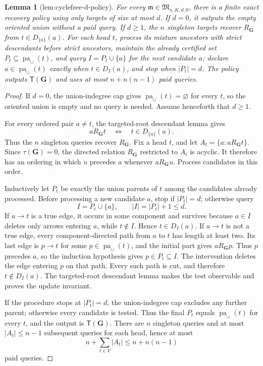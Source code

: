 \documentclass{article}
\newtheorem{lemma}{Lemma}
\begin{document}
\begin{lemma}[lem:cyclefree-d-policy]\label{lem:cyclefree-d-policy}
For every \(\mathfrak m\in\mathfrak M_{n,K,d,0}\), there is a finite exact recovery policy using only targets of size at most \(d\). If \(d=0\), it outputs the empty oriented union without a paid query. If \(d\ge1\), the \(n\) singleton targets recover \(R_{\mathbf G}\) from \(t\in D_{\{a\}}(a)\). For each head \(t\), process its mixture ancestors with strict descendants before strict ancestors, maintain the already certified set \(P_t\subseteq\operatorname{pa}_{\cup}(t)\), and query \(I=P_t\cup\{a\}\) for the next candidate \(a\); declare \(a\in\operatorname{pa}_{\cup}(t)\) exactly when \(t\in D_I(a)\), and stop when \(|P_t|=d\). The policy outputs \(\mathsf T(\mathbf G)\) and uses at most \(n+n(n-1)\) paid queries.
\end{lemma}
\begin{proof}
If \(d=0\), the union-indegree cap gives \(\operatorname{pa}_{\cup}(t)=\varnothing\) for every \(t\), so the oriented union is empty and no query is needed. Assume henceforth that \(d\ge1\).

For every ordered pair \(a\ne t\), the targeted-root descendant lemma gives
\[
 aR_{\mathbf G}t
 \quad\Longleftrightarrow\quad
 t\in D_{\{a\}}(a).
\]
Thus the \(n\) singleton queries recover \(R_{\mathbf G}\). Fix a head \(t\), and let \(A_t=\{a:aR_{\mathbf G}t\}\). Since \(\tau(\mathbf G)=0\), the directed relation \(R_{\mathbf G}\) restricted to \(A_t\) is acyclic. It therefore has an ordering in which \(u\) precedes \(a\) whenever \(aR_{\mathbf G}u\). Process candidates in this order.

Inductively let \(P_t\) be exactly the union parents of \(t\) among the candidates already processed. Before processing a new candidate \(a\), stop if \(|P_t|=d\); otherwise query
\[
 I=P_t\cup\{a\},\qquad |I|=|P_t|+1\le d.
\]
If \(a\to t\) is a true edge, it occurs in some component and survives because \(a\in I\) deletes only arrows entering \(a\), while \(t\notin I\). Hence \(t\in D_I(a)\). If \(a\to t\) is not a true edge, every component-directed path from \(a\) to \(t\) has length at least two. Its last edge is \(p\to t\) for some \(p\in\operatorname{pa}_{\cup}(t)\), and the initial part gives \(aR_{\mathbf G}p\). Thus \(p\) precedes \(a\), so the induction hypothesis gives \(p\in P_t\subseteq I\). The intervention deletes the edge entering \(p\) on that path. Every such path is cut, and therefore \(t\notin D_I(a)\). The targeted-root descendant lemma makes the test observable and proves the update invariant.

If the procedure stops at \(|P_t|=d\), the union-indegree cap excludes any further parent; otherwise every candidate is tested. Thus the final \(P_t\) equals \(\operatorname{pa}_{\cup}(t)\) for every \(t\), and the output is \(\mathsf T(\mathbf G)\). There are \(n\) singleton queries and at most \(|A_t|\le n-1\) subsequent queries for each head, hence at most
\[
 n+\sum_{t\in V}|A_t|\le n+n(n-1)
\]
paid queries.
\end{proof}
\end{document}
